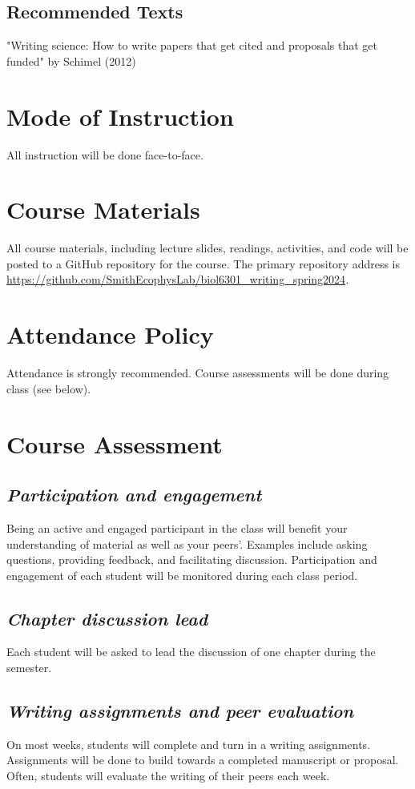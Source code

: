 \documentclass[12pt, notitlepage]{article}   	%
\begin{document}
{\subsection{Recommended Texts}
"Writing science: How to write papers that get cited and proposals that get funded" by Schimel (2012) \par

\section{Mode of Instruction}
All instruction will be done face-to-face.

\section{Course Materials}
All course materials, including lecture slides, readings, activities, and code 
will be posted to a GitHub repository for the course.
The primary repository address is
\url{https://github.com/SmithEcophysLab/biol6301_writing_spring2024}.

\section{Attendance Policy}
Attendance is strongly recommended. 
Course assessments will be done during class (see below).

\section{Course Assessment}
\subsection{\textit{Participation and engagement}}
Being an active and engaged participant in the class will benefit your understanding
of material as well as your peers'. Examples include asking questions, providing feedback,
and facilitating discussion. Participation and engagement of each student will be monitored
during each class period.

\subsection{\textit{Chapter discussion lead}}
Each student will be asked to lead the discussion of one chapter during the semester.

\subsection{\textit{Writing assignments and peer evaluation}}
On most weeks, students will complete and turn in a writing assignments. Assignments will
be done to build towards a completed manuscript or proposal. Often, students will evaluate the writing of their peers each week.

}
\end{document}
